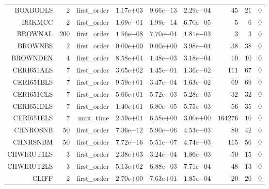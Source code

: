 \begin{longtable}{rrrrrrrrr}
BOXBODLS & \(     2\) & first\_order & \( 1.17\)e\(+03\) & \( 9.66\)e\(-13\) & \( 2.29\)e\(-04\) & \(    45\) & \(    21\) & \(     0\) \\
BRKMCC & \(     2\) & first\_order & \( 1.69\)e\(-01\) & \( 1.99\)e\(-14\) & \( 6.70\)e\(-05\) & \(     5\) & \(     6\) & \(     0\) \\
BROWNAL & \(   200\) & first\_order & \( 1.56\)e\(-08\) & \( 7.70\)e\(-04\) & \( 1.81\)e\(-03\) & \(     3\) & \(     3\) & \(     0\) \\
BROWNBS & \(     2\) & first\_order & \( 0.00\)e\(+00\) & \( 0.00\)e\(+00\) & \( 3.98\)e\(-04\) & \(    38\) & \(    38\) & \(     0\) \\
BROWNDEN & \(     4\) & first\_order & \( 8.58\)e\(+04\) & \( 1.48\)e\(-03\) & \( 3.18\)e\(-04\) & \(    10\) & \(    10\) & \(     0\) \\
CERI651ALS & \(     7\) & first\_order & \( 3.65\)e\(+02\) & \( 1.45\)e\(-01\) & \( 1.36\)e\(-02\) & \(   111\) & \(    67\) & \(     0\) \\
CERI651BLS & \(     7\) & first\_order & \( 9.59\)e\(+01\) & \( 3.47\)e\(-04\) & \( 1.63\)e\(-02\) & \(    69\) & \(    69\) & \(     0\) \\
CERI651CLS & \(     7\) & first\_order & \( 5.66\)e\(+01\) & \( 5.72\)e\(-03\) & \( 5.28\)e\(-03\) & \(    32\) & \(    32\) & \(     0\) \\
CERI651DLS & \(     7\) & first\_order & \( 1.40\)e\(+01\) & \( 6.80\)e\(-05\) & \( 5.75\)e\(-03\) & \(    56\) & \(    35\) & \(     0\) \\
CERI651ELS & \(     7\) & max\_time & \( 2.59\)e\(+01\) & \( 6.58\)e\(+00\) & \( 3.00\)e\(+00\) & \(164276\) & \(    10\) & \(     0\) \\
CHNROSNB & \(    50\) & first\_order & \( 7.36\)e\(-12\) & \( 5.90\)e\(-06\) & \( 4.53\)e\(-03\) & \(    80\) & \(    42\) & \(     0\) \\
CHNRSNBM & \(    50\) & first\_order & \( 7.72\)e\(-16\) & \( 5.51\)e\(-07\) & \( 4.74\)e\(-03\) & \(   115\) & \(    56\) & \(     0\) \\
CHWIRUT1LS & \(     3\) & first\_order & \( 2.38\)e\(+03\) & \( 3.24\)e\(-04\) & \( 1.86\)e\(-03\) & \(    50\) & \(    15\) & \(     0\) \\
CHWIRUT2LS & \(     3\) & first\_order & \( 5.13\)e\(+02\) & \( 6.88\)e\(-03\) & \( 7.71\)e\(-04\) & \(    48\) & \(    13\) & \(     0\) \\
CLIFF & \(     2\) & first\_order & \( 2.70\)e\(+00\) & \( 7.63\)e\(+01\) & \( 1.85\)e\(-04\) & \(    20\) & \(    20\) & \(     0\) \\

\end{longtable}
